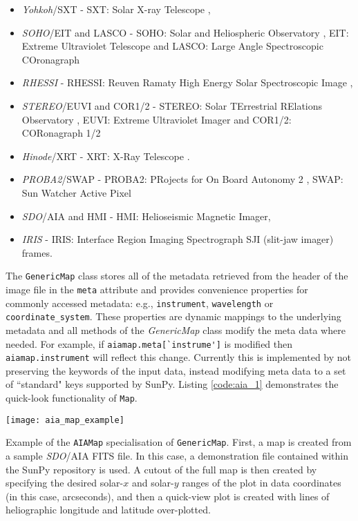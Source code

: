 \begin{itemize}
\item \textit{Yohkoh}/SXT - SXT: Solar X-ray Telescope \citep{1991SoPh..136....1O, 1991SoPh..136...37T},
\item \textit{SOHO}/EIT and LASCO - SOHO: Solar and Heliospheric Observatory \citep{domingo1995}, EIT: Extreme Ultraviolet Telescope \citep{1995SoPh..162..291D} and LASCO: Large Angle Spectroscopic COronagraph \citep{1995SoPh..162..357B}
\item \textit{RHESSI} - RHESSI: Reuven Ramaty High Energy Solar Spectroscopic Image \citep{2002SoPh..210....3L},
\item \textit{STEREO}/EUVI and COR1/2 - STEREO: Solar TErrestrial RElations Observatory \citep{2005AdSpR..36.1483K}, EUVI: Extreme Ultraviolet Imager \citep{2004SPIE.5171..111W} and COR1/2: CORonagraph 1/2 \citep{2002AdSpR..29.2017H}
\item \textit{Hinode}/XRT - XRT: X-Ray Telescope \citep{2007SoPh..243....3K, 2007SoPh..243...63G}.
\item \textit{PROBA2}/SWAP - PROBA2: PRojects for On Board Autonomy 2 \citep{2013SoPh..286....5S}, SWAP: Sun Watcher Active Pixel \citep{2013SoPh..286...43S}
\item \textit{SDO}/AIA and HMI - HMI: Helioseismic Magnetic Imager, \citep{2012SoPh..275..207S}
\item \textit{IRIS} - IRIS: Interface Region Imaging Spectrograph \citep{2011SPD....42.1512L} SJI (slit-jaw imager) frames.           
\end{itemize}
             
The \texttt{GenericMap} class stores all of the metadata retrieved from the header of
the image file in the \texttt{meta} attribute and provides convenience 
properties for commonly accessed metadata: e.g., \texttt{instrument}, 
\texttt{wavelength} or \texttt{coordinate\_system}.
These properties are dynamic mappings to the underlying metadata and all methods 
of the \textit{GenericMap} class modify the meta data where needed.
For example, if \verb|aiamap.meta[`instrume']| is modified then \verb|aiamap.instrument| 
will reflect this change.
Currently this is implemented by not preserving the keywords of the input data,
instead modifying meta data to a set of ``standard" keys supported by SunPy.
Listing \ref{code:aia_1} demonstrates the quick-look functionality of 
\texttt{Map}.

\begin{listing}[H]
\begin{center}
\texttt{[image: aia\_map\_example]}
\end{center}
\caption{Example of the \texttt{AIAMap} specialisation of 
\texttt{GenericMap}. First, a map is created from a sample \textit{SDO}/AIA FITS file. In this case, a demonstration file contained within the SunPy repository is used. A cutout
of the full map is then created by specifying the desired solar-$x$ and solar-$y$ ranges of the plot in data coordinates (in this case, arcseconds), and then a quick-view plot is created with lines of heliographic longitude and latitude over-plotted.}
\label{code:aia_1}
\end{listing}

